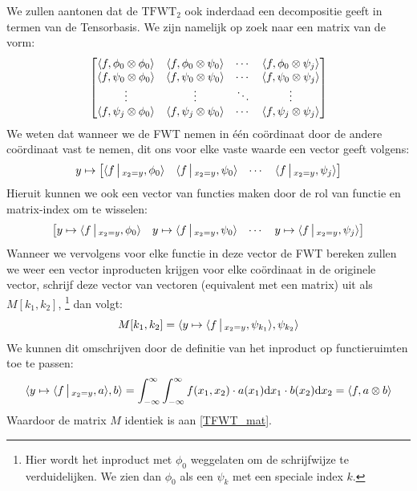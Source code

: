 We zullen aantonen dat de $\mathrm{TFWT}_2$ ook inderdaad een decompositie geeft in termen van de Tensorbasis.
We zijn namelijk op zoek naar een matrix van de vorm:
\begin{equation}
\label{TFWT_mat}
\begin{bmatrix}
\langle f , \phi_0\otimes\phi_0 \rangle     & \langle f , \phi_0\otimes\psi_0 \rangle     & \cdots & \langle f , \phi_0\otimes\psi_j \rangle \\
\langle f , \psi_0\otimes\phi_0 \rangle     & \langle f , \psi_0\otimes\psi_0 \rangle     & \cdots & \langle f , \psi_0\otimes\psi_j \rangle \\ 
           \vdots                 &         \vdots                    & \ddots &                \vdots  \\ 
\langle f , \psi_j\otimes\phi_0 \rangle & \langle f , \psi_j\otimes\psi_0 \rangle 
& \cdots & \langle f , \psi_j\otimes\psi_j \rangle \\
\end{bmatrix}
\end{equation}
We weten dat wanneer we de FWT nemen in \'e\'en co\"ordinaat door de andere co\"ordinaat vast te nemen,
 dit ons voor elke vaste waarde een vector geeft volgens:
\[
y \mapsto
\begin{bmatrix}
\langle f\,\big|\,_{x_2=y} , \phi_0 \rangle & 
\langle f\,\big|\,_{x_2=y} , \psi_0 \rangle & \cdots & 
\langle f\,\big|\,_{x_2=y} , \psi_j \rangle
\end{bmatrix}
\]
Hieruit kunnen we ook een vector van functies maken door de rol van functie en matrix-index om te wisselen:
\[
\begin{bmatrix}
y \mapsto \langle f\,\big|\,_{x_2=y} , \phi_0 \rangle & 
y \mapsto \langle f\,\big|\,_{x_2=y} , \psi_0 \rangle & \cdots & 
y \mapsto \langle f\,\big|\,_{x_2=y} , \psi_j \rangle
\end{bmatrix}
\]
Wanneer we vervolgens voor elke functie in deze vector de FWT bereken zullen we weer een vector inproducten krijgen
voor elke co\"ordinaat in de originele vector, schrijf deze vector van vectoren (equivalent met een matrix) uit als 
$M[k_1,k_2]$,
\footnote{Hier wordt het inproduct met $\phi_0$ weggelaten om de schrijfwijze te verduidelijken. We zien
dan $\phi_0$ als een $\psi_k$ met een speciale index $k$.}
dan volgt:
\[
M[k_1,k_2] = \langle y\mapsto \langle f\,\big|\,_{x_2=y} , \psi_{k_1} \rangle , \psi_{k_2} \rangle
\]
We kunnen dit omschrijven door de definitie van het inproduct op functieruimten toe te passen:
\[
\langle y\mapsto \langle f\,\big|\,_{x_2=y} , a \rangle , b \rangle = 
\int_{-\infty}^\infty\int_{-\infty}^\infty f(x_1,x_2) \cdot a(x_1) {\mathrm{d} x_1} \cdot b(x_2) {\mathrm{d} x_2} = \langle f , a\otimes b \rangle 
\]
Waardoor de matrix $M$ identiek is aan \eqref{TFWT_mat}. 

